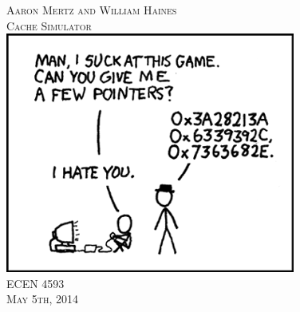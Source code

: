 \begin{titlepage}
\begin{center}


\textsc{\LARGE Aaron Mertz and William Haines} \\ [1.5cm]
\textsc{\LARGE Cache Simulator} \\ [6cm]

\includegraphics[scale = 0.7]{alt_comic} \\ [6cm]

\textsc{\LARGE ECEN 4593} \\ [1.5cm]
\textsc{\LARGE May 5th, 2014} \\ [1.5cm]

\end{center}
\end{titlepage}